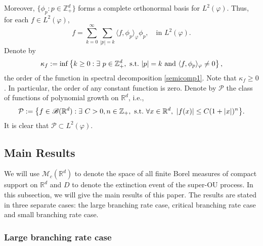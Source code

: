 \documentclass[12pt,a4paper]{amsart}
\theoremstyle{plain}
\theoremstyle{definition}
\numberwithin{equation}{section}
\begin{document}
    Moreover, $\{\phi_p: p \in \mathbb Z_+^d\}$ forms a complete 
    orthonormal basis for $L^2(\varphi)$.
    Thus, for each $f\in L^2(\varphi)$,
\begin{equation}\label{semicomp1}
    f
    =\sum_{k=0}^{\infty}\sum_{|p|=k}\langle f, \phi_p \rangle_{\varphi} \phi_p,
    \quad \text{in~} L^2(\varphi).
\end{equation}
    Denote by
\begin{equation}\label{order}
    \kappa_f
    :=\inf \left \{k\geq 0: \exists ~ p\in \mathbb Z_+^d ,{\rm ~s.t.~}|p|=k {\rm ~and~}  \langle f, \phi_p \rangle_{\varphi}\neq 0\right \},
\end{equation}
   the order of the function in spectral decomposition \eqref{semicomp1}.
    Note that $ \kappa_f\geq 0$.
    In particular, the order of any constant function is zero.
    Denote by $\mathcal P$ the class of functions of polynomial growth on $\mathbb R^d$, i.e.,
\begin{equation}
    \mathcal{P}
    :=\big \{f\in \mathscr B(\mathbb R^d):\exists~ C>0, n \in \mathbb Z_+, {\rm ~s.t.~} \forall x\in \mathbb R^d,~ |f(x)|\leq C(1+|x|)^n\big\}.
\end{equation}
    It is clear that $\mathcal{P} \subset L^2(\varphi)$.
\subsection{Main Results}
We will use $\mathcal M_c(\mathbb R^d)$ to denote the space of all
finite Borel measures of compact support on $\mathbb R^d$ and $D$ to denote the extinction event of the super-OU process.
In this subsection, we will give the main results of this paper.
The results are stated in three separate cases: the large branching rate case,
critical  branching rate case and small  branching rate case.

\subsubsection{Large branching rate case}
\end{document}
